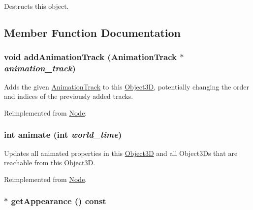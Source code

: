 Destructs this object. 

\subsection{Member Function Documentation}
\hypertarget{classm3g_1_1Sprite3D_415c0b110f95410ded9b85e5d99a496b}{
\subsubsection[{addAnimationTrack}]{\setlength{\rightskip}{0pt plus 5cm}void addAnimationTrack ({\bf AnimationTrack} $\ast$ {\em animation\_\-track})}}
\label{classm3g_1_1Sprite3D_415c0b110f95410ded9b85e5d99a496b}


Adds the given \hyperlink{classm3g_1_1AnimationTrack}{AnimationTrack} to this \hyperlink{classm3g_1_1Object3D}{Object3D}, potentially changing the order and indices of the previously added tracks. 

Reimplemented from \hyperlink{classm3g_1_1Node_415c0b110f95410ded9b85e5d99a496b}{Node}.\hypertarget{classm3g_1_1Sprite3D_8aad1ceab4c2a03609c8a42324ce484d}{
\subsubsection[{animate}]{\setlength{\rightskip}{0pt plus 5cm}int animate (int {\em world\_\-time})}}
\label{classm3g_1_1Sprite3D_8aad1ceab4c2a03609c8a42324ce484d}


Updates all animated properties in this \hyperlink{classm3g_1_1Object3D}{Object3D} and all Object3Ds that are reachable from this \hyperlink{classm3g_1_1Object3D}{Object3D}. 

Reimplemented from \hyperlink{classm3g_1_1Node_8aad1ceab4c2a03609c8a42324ce484d}{Node}.\hypertarget{classm3g_1_1Sprite3D_0219cb20ddea978a5796b5b414d012d2}{
\subsubsection[{getAppearance}]{ $\ast$ getAppearance () const}}
\label{classm3g_1_1Sprite3D_0219cb20ddea978a5796b5b414d012d2}


